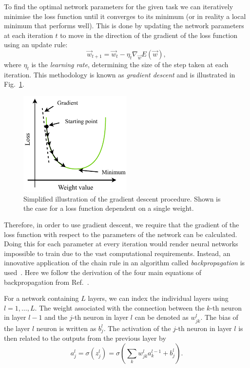 To find the optimal network parameters for the given task we can iteratively minimise the loss
function until it converges to its minimum (or in reality a local minimum that performs well).
This is done by updating the network parameters at each iteration $t$ to move in the direction of
the gradient of the loss function using an update rule:
\begin{equation} %
    \vec{w}_{t+1}=\vec{w}_{t}-\eta_{t}\nabla_{\vec{w}}E(\vec{w}),
    \label{eq:update_rule}
\end{equation}
where $\eta_{t}$ is the \emph{learning rate}, determining the size of the step taken at each
iteration. This methodology is known as \emph{gradient descent} and is illustrated in
Fig.~\ref{fig:gradient_descent}.

\begin{figure} %
    \includegraphics[width=0.5\textwidth]{diagrams/6-cvn/gradient_descent.pdf}
    \caption[Illustration of the gradient descent process.]
    {Simplified illustration of the gradient descent procedure. Shown is the case for a loss
        function dependent on a single weight.}
    \label{fig:gradient_descent}
\end{figure}

Therefore, in order to use gradient descent, we require that the gradient of the loss function
with respect to the parameters of the network can be calculated. Doing this for each parameter at
every iteration would render neural networks impossible to train due to the vast computational
requirements. Instead, an innovative application of the chain rule in an algorithm called
\emph{backpropagation} is used~\cite{werbos1974}. Here we follow the derivation of the four main
equations of backpropagation from Ref.~\cite{mehta2019}.

For a network containing $L$ layers, we can index the individual layers using $l=1,\dots,L$. The
weight associated with the connection between the $k$-th neuron in layer $l-1$ and the $j$-th
neuron in layer $l$ can be denoted as $w^{l}_{jk}$. The bias of the layer $l$ neuron is written as
$b^{l}_{j}$. The activation of the $j$-th neuron in layer $l$ is then related to the outputs from
the previous layer by
\begin{equation} %
    a^{l}_{j}=\sigma(z^{l}_{j})=\sigma\left(\sum_{k}w^{l}_{jk}a^{l-1}_{k}+b^{l}_{j}\right).
    \label{eq:feedforward}
\end{equation}

